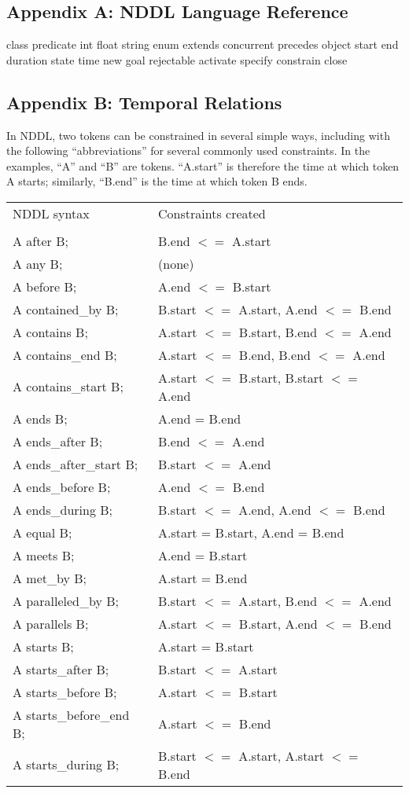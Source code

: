 \documentclass[10pt, letterpaper, twoside]{article}
\begin{document}
\subsection{Appendix A: NDDL Language Reference}
\label{nddl}

class
predicate
int
float
string
enum
extends
concurrent
precedes
object
start
end
duration
state
time
new
goal
rejectable
activate
specify
constrain
close

\subsection{Appendix B: Temporal Relations}
\label{allen}

In NDDL, two tokens can be constrained in several simple ways,
including with the following ``abbreviations'' for several commonly
used constraints.  In the examples, ``A'' and ``B'' are tokens.
``A.start'' is therefore the time at which token A starts; similarly,
``B.end'' is the time at which token B ends.

\begin{tabular}{ll}
NDDL syntax & Constraints created \\
\cline{1-2} \\
A after B; & B.end $<=$ A.start \\
A any B; & (none) \\
A before B; & A.end $<=$ B.start \\
A contained\_by B; & B.start $<=$ A.start, A.end $<=$ B.end \\
A contains B; & A.start $<=$ B.start, B.end $<=$ A.end \\
A contains\_end B; & A.start $<=$ B.end, B.end $<=$ A.end \\
A contains\_start B; & A.start $<=$ B.start, B.start $<=$ A.end \\
A ends B; & A.end = B.end \\
A ends\_after B; & B.end $<=$ A.end \\
A ends\_after\_start B; & B.start $<=$ A.end \\
A ends\_before B; & A.end $<=$ B.end \\
A ends\_during B; & B.start $<=$ A.end, A.end $<=$ B.end \\
A equal B; & A.start = B.start, A.end = B.end \\
A meets B; & A.end = B.start \\
A met\_by B; & A.start = B.end \\
A paralleled\_by B; & B.start $<=$ A.start, B.end $<=$ A.end \\
A parallels B; & A.start $<=$ B.start, A.end $<=$ B.end \\
A starts B; & A.start = B.start \\
A starts\_after B; & B.start $<=$ A.start \\
A starts\_before B; & A.start $<=$ B.start \\
A starts\_before\_end B; & A.start $<=$ B.end \\
A starts\_during B; & B.start $<=$ A.start, A.start $<=$ B.end \\
\end{tabular}
\end{document}
